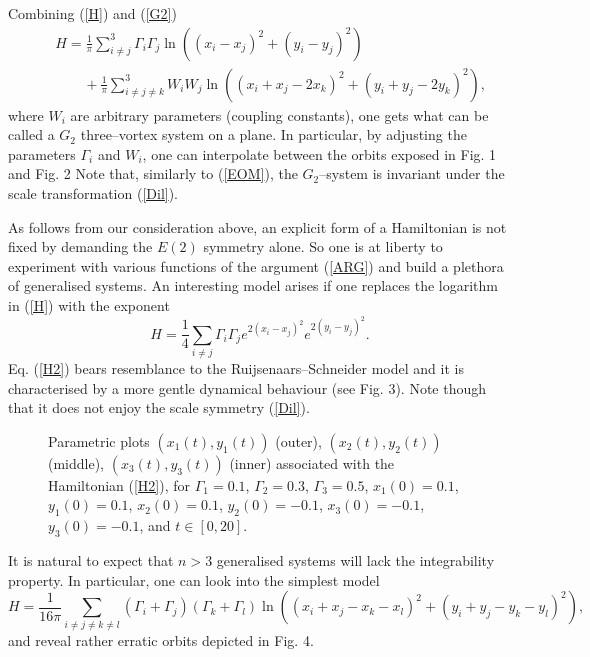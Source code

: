 \documentclass[12pt]{article}
\def\be{\begin{equation}}
\def\ee{\end{equation}}
\def\bea{\begin{eqnarray}}
\def\eea{\end{eqnarray}}
\begin{document}
Combining (\ref{H}) and (\ref{G2})
\bea\label{G2full}
&&
H=\frac{1}{\pi} \sum_{i\ne j}^3 \Gamma_i \Gamma_j \ln{\left({\left(x_i-x_j\right)}^2+{\left(y_i-y_j \right)}^2 \right)}
\nonumber\\[2pt]
&&
\qquad
+\frac{1}{\pi} \sum_{i\ne j \ne k}^3 W_i W_j \ln{\left({\left(x_i+x_j-2 x_k\right)}^2+{\left(y_i+y_j-2 y_k \right)}^2 \right)},
\eea
where $W_i$ are arbitrary parameters (coupling constants), one gets what can be called a $G_2$ three--vortex system on a plane. In particular, by adjusting the parameters $\Gamma_i$ and $W_i$, one can interpolate between the orbits exposed in Fig. 1 and Fig. 2 Note that, similarly to (\ref{EOM}), the $G_2$--system is invariant under the scale transformation (\ref{Dil}).

As follows from our consideration above, an explicit form of a Hamiltonian is not fixed by demanding the $E(2)$ symmetry alone. So one is at liberty to experiment with various functions of the argument (\ref{ARG}) and build a plethora of generalised systems. An interesting model arises if one replaces the logarithm in (\ref{H}) with the exponent
\be\label{H2}
H=\frac 14 \sum_{i\ne j}\Gamma_i \Gamma_j e^{2 {\left(x_i-x_j\right)}^2} e^{2 {\left(y_i-y_j \right)}^2}.
\ee
Eq. (\ref{H2}) bears resemblance to the Ruijsenaars--Schneider model \cite{RS} and it is characterised by a more gentle dynamical behaviour (see Fig. 3). Note though that it does not enjoy the scale symmetry (\ref{Dil}).


\begin{figure}[ht]
\begin{center}
\vskip-4mm
\caption{\small Parametric plots $(x_1 (t),y_1 (t))$ (outer), $(x_2 (t),y_2 (t))$ (middle), $(x_3 (t),y_3 (t))$ (inner) associated with the Hamiltonian (\ref{H2}), for $\Gamma_1=0.1$, $\Gamma_2=0.3$, $\Gamma_3=0.5$, $x_1(0)=0.1$, $y_1 (0)=0.1$, $x_2 (0)=0.1$, $y_2 (0)=-0.1$, $x_3 (0)=-0.1$, $y_3 (0)=-0.1$, and $t \in [0,20]$.}
\label{fig3}
\end{center}
\end{figure}

It is natural to expect that $n>3$ generalised systems will lack the integrability property. In particular, one can look into the simplest model 
\be\label{H4}
H=\frac{1}{16 \pi} \sum_{i\ne j \ne k \ne l}(\Gamma_i+\Gamma_j)(\Gamma_k+\Gamma_l) \ln{\left( {(x_i+x_j-x_k-x_l)}^2+{(y_i+y_j-y_k-y_l)}^2 \right)},
\ee
and reveal rather erratic orbits depicted in Fig. 4. 
\end{document}

